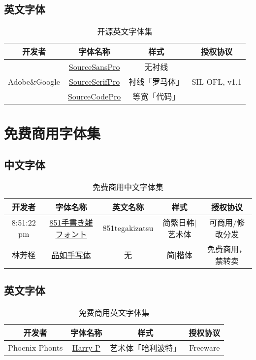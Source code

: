 \documentclass{../../PublicResources/DocClass}
\begin{document}
    \clearpage
    \section{英文字体}
    \begin{table}[h]
        \centering \caption{开源英文字体集}
        \begin{tabular}{|*{4}{c|}}
            \hline
            开发者 & 字体名称 & 样式 & 授权协议 \\
            \hline
            \multirow{3}{*}{Adobe\&Google} & \href{https://github.com/adobe-fonts/source-sans-pro}{SourceSansPro} & 无衬线 & \multirow{3}{*}{SIL OFL, v1.1} \\
            \cline{2-3}
            & \href{https://github.com/adobe-fonts/source-serif-pro}{SourceSerifPro} & 衬线「罗马体」 & \\
            \cline{2-3}
            & \href{https://github.com/adobe-fonts/source-code-pro}{SourceCodePro} & 等宽「代码」 & \\
            \hline
        \end{tabular}
    \end{table}

    \chapter{免费商用字体集}
    \section{中文字体}
    \begin{table}[h]
    \centering \caption{免费商用中文字体集}
        \begin{tabular}{|*{5}{c|}}
            \hline
            开发者 & 字体名称 & 英文名称 & 样式 & 授权协议 \\
            \hline
            8:51:22 pm & \href{https://pm85122.onamae.jp/851fontpage.html}{851手書き雑フォント} & 851tegakizatsu & 简繁日韩|艺术体 & 可商用/修改分发 \\
            \hline
            林芳柽 & \href{https://www.zcool.com.cn/work/ZMjE0MjQyMDg=.html}{品如手写体} & 无 & 简|楷体 & 免费商用，禁转卖 \\
            \hline
        \end{tabular}
    \end{table}

    \section{英文字体}
    \begin{table}[h]
        \centering \caption{免费商用英文字体集}
        \begin{tabular}{|*{4}{c|}}
            \hline
            开发者 & 字体名称 & 样式 & 授权协议 \\
            \hline
            Phoenix Phonts & \href{https://www.fontspace.com/harry-p-font-f44342}{Harry P} & 艺术体「哈利波特」 & Freeware \\
            \hline
        \end{tabular}
    \end{table}
\end{document}
